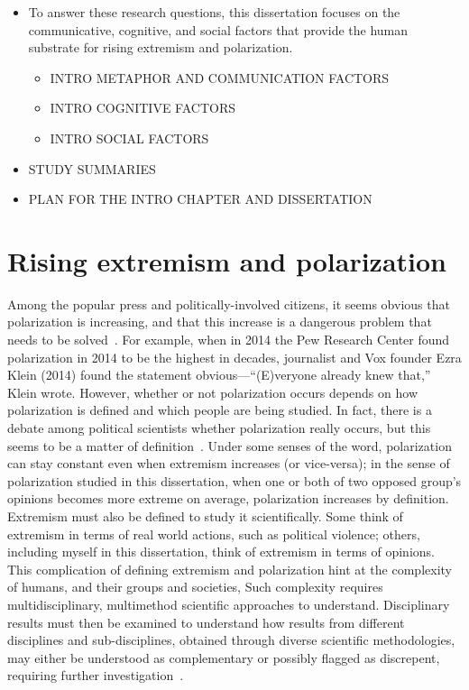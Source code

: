 \documentclass[12pt,letterpaper]{article}
\begin{document}
\begin{itemize}
  \item
    To answer these research questions, this dissertation focuses on the communicative, cognitive,
    and social factors that provide the human substrate for rising extremism
    and polarization. 

  \begin{itemize}
    \item
      INTRO METAPHOR AND COMMUNICATION FACTORS

    \item
      INTRO COGNITIVE FACTORS

    \item
      INTRO SOCIAL FACTORS
  \end{itemize}

  \item
    STUDY SUMMARIES

  \item
    PLAN FOR THE INTRO CHAPTER AND DISSERTATION

\end{itemize}


\section{Rising extremism and polarization}

Among the popular press and politically-involved citizens, it seems obvious
that polarization is increasing, and that this increase is a 
dangerous problem that needs to be solved~\cite{Klein2020}. 
For example, when in 2014 the Pew Research Center found polarization
in 2014 to be the highest in decades, journalist and Vox founder Ezra Klein 
(2014) found the statement obvious---``(E)veryone already knew that,'' Klein
wrote. However, whether or not polarization occurs depends on how polarization 
is defined and which people are being studied. 
In fact, there is a debate among political scientists whether
polarization really occurs, but this seems to be a matter of definition~\cite{Mason2015,Lelkes2016,Kinder2017}.
Under some senses of the word, polarization can stay constant even when extremism increases (or vice-versa);
in the sense of polarization studied in this dissertation,
when one or both of two opposed group's opinions becomes more
extreme on average, polarization increases by definition. Extremism must also
be defined to study it scientifically. Some think of extremism in
terms of real world actions, such as political violence; others, including
myself in this dissertation, think of extremism in terms of opinions. This complication of defining
extremism and polarization hint at the complexity of humans, and their groups
and societies, Such complexity requires multidisciplinary, multimethod
scientific approaches to understand. Disciplinary results must then
be examined to understand how results from different disciplines and sub-disciplines, obtained through
diverse scientific methodologies, may either be understood as complementary or 
possibly flagged as discrepent, requiring further 
investigation~\cite{Cartwright1999,Brewer2013}.
\end{document}
